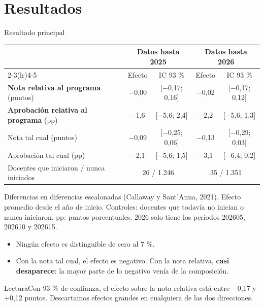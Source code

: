 \documentclass[10pt,aspectratio=169]{beamer}
\newcommand{\sintesis}[2]{%
  \begin{block}{#1}#2\end{block}}
\begin{document}
\section{Resultados}

\begin{frame}{Resultado principal}
  \begin{table}\small
    \begin{tabular}{lcccc}
      \toprule
      & \multicolumn{2}{c}{Datos hasta 2025} & \multicolumn{2}{c}{Datos hasta 2026} \\
      \cmidrule(lr){2-3}\cmidrule(lr){4-5}
      & Efecto & IC 93 \% & Efecto & IC 93 \% \\
      \midrule
      \textbf{Nota relativa al programa} (puntos) & $-$0,00 & [$-$0,17; 0,16] & $-$0,02 & [$-$0,17; 0,12] \\
      \textbf{Aprobación relativa al programa} (pp) & $-$1,6 & [$-$5,6; 2,4] & $-$2,2 & [$-$5,6; 1,3] \\
      \midrule
      Nota tal cual (puntos) & $-$0,09 & [$-$0,25; 0,06] & $-$0,13 & [$-$0,29; 0,03] \\
      Aprobación tal cual (pp) & $-$2,1 & [$-$5,6; 1,5] & $-$3,1 & [$-$6,4; 0,2] \\
      \midrule
      Docentes que iniciaron / nunca iniciados & \multicolumn{2}{c}{26 / 1.246} & \multicolumn{2}{c}{35 / 1.351} \\
      \bottomrule
    \end{tabular}
  \end{table}
  {\scriptsize Diferencias en diferencias escalonadas (Callaway y Sant'Anna, 2021). Efecto promedio desde el año de inicio. Controles: docentes que todavía no inician o nunca iniciaron. pp: puntos porcentuales. 2026 solo tiene los períodos 202605, 202610 y 202615.}
  \vspace{0.3em}
  \begin{itemize}\small
    \item Ningún efecto es distinguible de cero al 7 \%.
    \item Con la nota tal cual, el efecto es negativo. Con la nota relativa, \textbf{casi desaparece}: la mayor parte de lo negativo venía de la composición.
  \end{itemize}
  \sintesis{Lectura}{Con 93 \% de confianza, el efecto sobre la nota relativa está entre $-$0,17 y +0,12 puntos. Descartamos efectos grandes en cualquiera de las dos direcciones.}
\end{frame}
\end{document}
